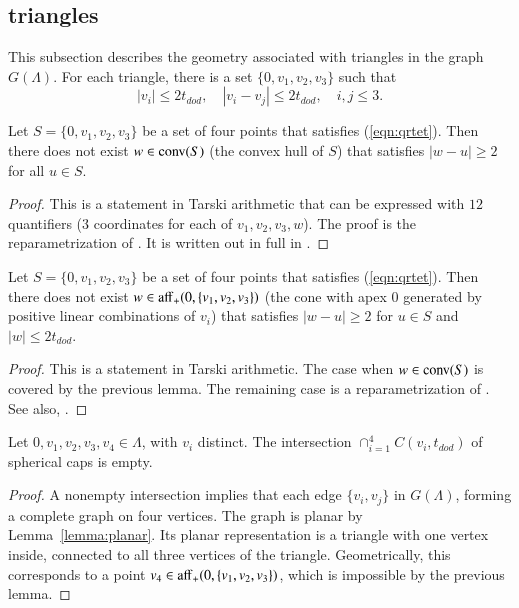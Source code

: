 \subsection{triangles}

This subsection describes the geometry associated with
triangles in the graph $G(\Lambda)$.  For each triangle,
there is a set $\{0,v_1,v_2,v_3\}$ such that
\begin{equation}\label{eqn:qrtet}
  |v_i| \le 2t_{dod},\quad |v_i-v_j | \le 2 t_{dod},\quad i,j\le 3.
\end{equation}

\begin{lemma} Let $S=\{0,v_1,v_2,v_3\}$ be a set of four points
that satisfies (\ref{eqn:qrtet}).  Then
there does not exist $w\in{\operatorname{conv}}(S)$
(the convex hull of $S$) that satisfies $|w-u|\ge 2$ for all
$u\in S$.
\end{lemma}

\begin{proof}  This is a statement in Tarski arithmetic 
that can be expressed with $12$ quantifiers ($3$ coordinates
for each of $v_1,v_2,v_3,w$).  The proof is
the reparametrization of \cite[Lemma~4.15]{DCG}.
It is written out in full in \cite[Lemma~3.3]{arx}.
\end{proof}

\begin{lemma}\label{lemma:enclosed} 
Let $S=\{0,v_1,v_2,v_3\}$ be a set of four points
that satisfies (\ref{eqn:qrtet}).  Then
there does not exist $w\in{\operatorname{aff}}_+(0,\{v_1,v_2,v_3\})$
(the cone with apex $0$ 
generated by positive linear combinations of $v_i$) 
that satisfies $|w-u|\ge 2$ for 
$u\in S$ and $|w|\le 2t_{dod}$.
\end{lemma}

\begin{proof} This is a statement in Tarski arithmetic.
The case when $w\in{\operatorname{conv}}(S)$ is covered by the previous lemma.
The remaining case is a reparametrization of
\cite[Lemma~4.19]{DCG}.  See also,  \cite[Cor~3.7]{arx}.
\end{proof}

\begin{lemma}\label{lemma:4fold}  
Let $0,v_1,v_2,v_3,v_4\in\Lambda$, with
$v_i$ distinct.  The intersection $\cap_{i=1}^4 C(v_i,t_{dod})$
of spherical caps is empty.
\end{lemma}

\begin{proof}  A nonempty intersection implies that each
edge $\{v_i,v_j\}$ in  $G(\Lambda)$, forming a complete graph
on four vertices.  The graph is planar by Lemma~\ref{lemma:planar}.
Its planar representation is a triangle with one vertex inside,
connected to all three vertices of the triangle.
Geometrically, this corresponds to a point $v_4\in{\operatorname{aff}}_+(0,\{v_1,v_2,v_3\})$, which is impossible by the previous lemma.
\end{proof}

